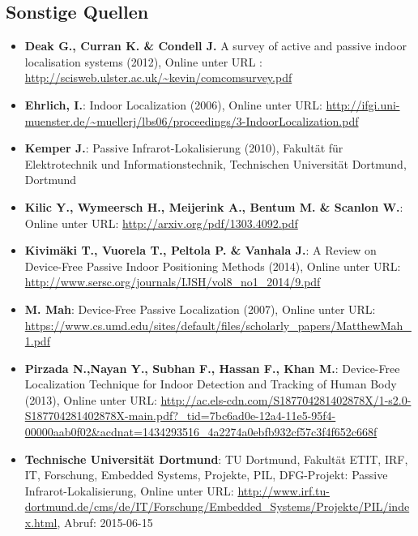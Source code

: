 \subsection*{Sonstige Quellen}
\begin{itemize}[leftmargin=*]
\item[] \textbf{Deak G., Curran K. \& Condell J.} A survey of active and passive indoor localisation systems (2012), Online unter URL : \url{http://scisweb.ulster.ac.uk/~kevin/comcomsurvey.pdf}
\item[] \textbf{Ehrlich, I.}: Indoor Localization (2006), Online unter URL: \url{http://ifgi.uni-muenster.de/~muellerj/lbs06/proceedings/3-IndoorLocalization.pdf}
\item[] \textbf{Kemper J.}: Passive Infrarot-Lokalisierung (2010), Fakultät für Elektrotechnik und Informationstechnik, Technischen Universität Dortmund, Dortmund
\item[] \textbf{Kilic Y., Wymeersch H., Meijerink A., Bentum M. \& Scanlon W.}: Online unter URL: \url{http://arxiv.org/pdf/1303.4092.pdf}
\item[] \textbf{Kivimäki T., Vuorela T., Peltola P. \& Vanhala J.}: A Review on Device-Free Passive Indoor Positioning Methods (2014), Online unter URL: \url{http://www.sersc.org/journals/IJSH/vol8_no1_2014/9.pdf}
\item[] \textbf{M. Mah}: Device-Free Passive Localization (2007), Online unter URL: \url{https://www.cs.umd.edu/sites/default/files/scholarly_papers/MatthewMah_1.pdf}
\item[] \textbf{Pirzada N.,Nayan Y., Subhan F., Hassan F., Khan M.}: Device-Free Localization Technique for Indoor Detection and Tracking of Human Body (2013), Online unter URL: \url{http://ac.els-cdn.com/S187704281402878X/1-s2.0-S187704281402878X-main.pdf?_tid=7bc6ad0e-12a4-11e5-95f4-00000aab0f02&acdnat=1434293516_4a2274a0ebfb932cf57c3f4f652c668f}
\item[] \textbf{Technische Universität Dortmund}: TU Dortmund, Fakultät ETIT, IRF, IT, Forschung, Embedded Systems,  Projekte, PIL, DFG-Projekt: Passive Infrarot-Lokalisierung, Online unter URL: \url{http://www.irf.tu-dortmund.de/cms/de/IT/Forschung/Embedded_Systems/Projekte/PIL/index.html}, Abruf: 2015-06-15
\end{itemize}
